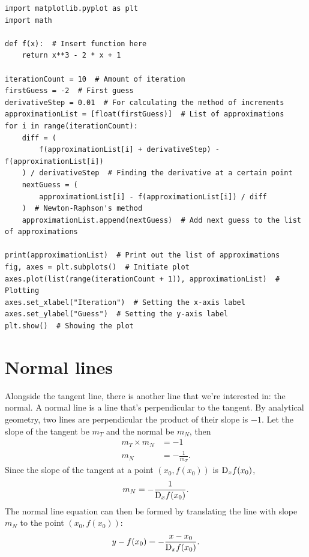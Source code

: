 \begin{verbatim}
import matplotlib.pyplot as plt
import math

def f(x):  # Insert function here
    return x**3 - 2 * x + 1

iterationCount = 10  # Amount of iteration
firstGuess = -2  # First guess
derivativeStep = 0.01  # For calculating the method of increments
approximationList = [float(firstGuess)]  # List of approximations
for i in range(iterationCount):
    diff = (
        f(approximationList[i] + derivativeStep) - f(approximationList[i])
    ) / derivativeStep  # Finding the derivative at a certain point
    nextGuess = (
        approximationList[i] - f(approximationList[i]) / diff
    )  # Newton-Raphson's method
    approximationList.append(nextGuess)  # Add next guess to the list of approximations

print(approximationList)  # Print out the list of approximations
fig, axes = plt.subplots()  # Initiate plot
axes.plot(list(range(iterationCount + 1)), approximationList)  # Plotting
axes.set_xlabel("Iteration")  # Setting the x-axis label
axes.set_ylabel("Guess")  # Setting the y-axis label
plt.show()  # Showing the plot
\end{verbatim}

\section{Normal lines}
\label{sec:normal-lines}

Alongside the tangent line, there is another line that we're interested in: the normal. A normal line is a line that's perpendicular to the tangent. By analytical geometry, two lines are perpendicular \ifft the product of their slope is $-1$. Let the slope of the tangent be $m_T$ and the normal be $m_N$, then
\begin{align}
  m_T \times m_N & = -1              \\
  m_N            & = -\frac{1}{m_T}.
\end{align}
Since the slope of the tangent at a point $(x_0, f(x_0))$ is $\mdif{x}f(x_0)$,
\begin{equation}
  m_N = -\frac{1}{\mdif{x}f(x_0)}.
\end{equation}
The normal line equation can then be formed by translating the line with slope $m_N$ to the point $(x_0, f(x_0))$:
\begin{equation}
  y - f(x_0) = -\frac{x - x_0}{\mdif{x}f(x_0)}.
\end{equation}

